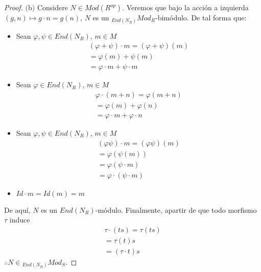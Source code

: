 \documentclass{article}
\newcommand{\lrprth}[1]{
    \left(#1\right)
}
\theoremstyle{definition}
\theoremstyle{plain}
\theoremstyle{plain}
\theoremstyle{definition}
\theoremstyle{definition}
\theoremstyle{definition}
\theoremstyle{definition}
\theoremstyle{definition}
\theoremstyle{definition}
\begin{document}
\begin{enumerate}[label=\textbf{Ej \arabic*.}]
\begin{proof}
		$\boxed{\text{(b)}}$ Considere $N \in Mod\lrprth{R^{op}}$. Veremos que bajo la acción a izquierda $\lrprth{g,n} \mapsto g \cdot n = g\lrprth{n}$, $N$ es un $_{End\lrprth{N_{R}}}Mod_{R}$-bimódulo. De tal forma que:
		\begin{itemize}
			\item Sean $\varphi , \psi \in End\lrprth{N_{R}}$, $m \in M$
			\begin{align*}
				\lrprth{ \varphi + \psi } \cdot m=\lrprth{ \varphi + \psi }\lrprth{m}\\
				=\varphi \lrprth{m} + \psi \lrprth{m}\\
				=\varphi \cdot m + \psi \cdot m
			\end{align*}
			\item Sean $\varphi\in End\lrprth{N_{R}}$, $m \in M$
			\begin{align*}
				\varphi\cdot\lrprth{m+n}=\varphi\lrprth{m+n}\\
				=\varphi\lrprth{m}+\varphi\lrprth{n}\\
				=\varphi \cdot m + \varphi \cdot n
			\end{align*}
			\item Sean $\varphi , \psi \in End\lrprth{N_{R}}$, $m \in M$
			\begin{align*}
				\lrprth{ \varphi\psi } \cdot m=\lrprth{ \varphi\psi }\lrprth{m}\\
				=\varphi \lrprth{ \psi \lrprth{m}}\\
				=\varphi \lrprth{ \psi \cdot m}\\
				=\varphi \cdot \lrprth{ \psi \cdot m}
			\end{align*}
			\item $Id \cdot m=Id\lrprth{m}=m$
		\end{itemize}
		De aquí, $N$ es un $End\lrprth{N_{R}}$-módulo. Finalmente, apartir de que todo morfismo $\tau$ induce 
		\begin{align*}
			\tau \cdot \lrprth{ts} = \tau \lrprth{ts}\\
			=\tau \lrprth{t}s\\
			=\lrprth{ \tau \cdot t }s
		\end{align*}
		$\therefore N \in {}_{End\lrprth{N_{R}}}Mod_{S}$.
	\end{proof}
\end{enumerate}
\end{document}
